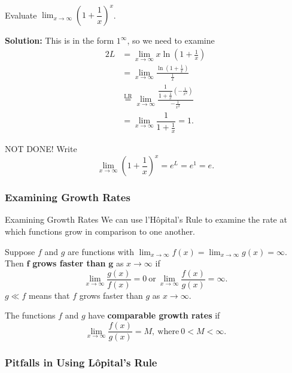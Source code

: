 \documentclass[cal1spr16Lectures.tex]{subfiles}
\begin{document}
\begin{frame}
\frametitle{}
\small
\begin{ex} Evaluate $\displaystyle\lim_{x \to \infty} \left( 1+\dfrac{1}{x} \right)^x$. \end{ex}
\footnotesize
{\bf Solution:}  This is in the form $1^{\infty}$, so we need to examine
\begin{alignat*}{2}
L &= \lim_{x \to \infty} x \ln \left( 1 + \frac{1}{x} \right) \\
 &= \lim_{x \to \infty} \frac{\ln \left( 1 + \frac{1}{x} \right)}{ \frac{1}{x}} \\
 &\overset{\text{LR}}{=} \lim_{x \to \infty} \frac{ \dfrac{1}{1+ \frac{1}{x}}\left(-\frac{1}{x^2}\right) }{- \frac{1}{x^2}} \\ 
&= \lim_{x \to \infty} \dfrac{1}{1+ \frac{1}{x}} = 1.
\end{alignat*}
\end{frame}

\begin{frame}
NOT DONE!  Write
\[\lim_{x \to \infty} \left( 1+\dfrac{1}{x} \right)^x = e^L = e^1 = e.\]
\end{frame}

\subsubsection{Examining Growth Rates}

\begin{frame}{\small Examining Growth Rates}
\footnotesize
We can use l'H\^{o}pital's Rule to examine the rate at which functions grow in comparison to one another.
\begin{dfn} Suppose $f$ and $g$ are functions with $\displaystyle\lim_{x \to \infty} f(x) = \displaystyle\lim_{x \to \infty} g(x) = \infty$.  Then $\boldsymbol{f}$ {\bf grows faster than} $\boldsymbol{g}$ as $x \to \infty$ if 
$$\lim_{x \to \infty} \frac{g(x)}{f(x)} = 0\ \text{or}\ \lim_{x \to \infty} \frac{f(x)}{g(x)} = \infty.$$
$g \ll f$ means that $f$ grows faster than $g$ as $x \to \infty$.
\end{dfn}

\begin{dfn} The functions $f$ and $g$ have {\bf comparable growth rates} if 
$$\lim_{x \to \infty} \frac{f(x)}{g(x)}=M,\ \text{where}\ 0<M<\infty.$$
\end{dfn}
\end{frame}

\subsubsection{Pitfalls in Using L\^opital's Rule}
\end{document}
